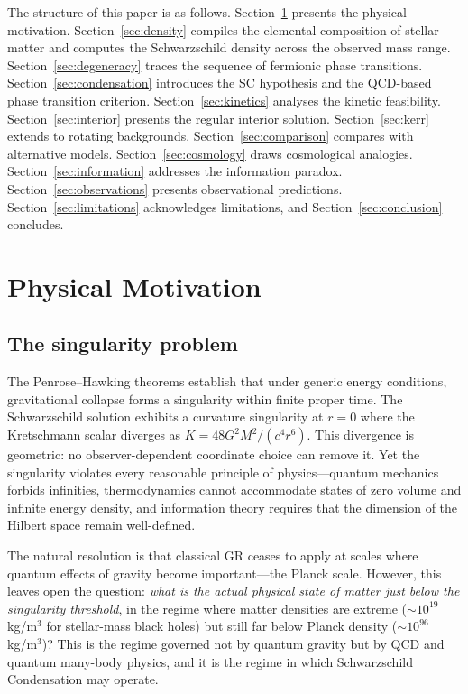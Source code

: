 \documentclass[epj]{svjour}
\begin{document}
The structure of this paper is as follows. Section~\ref{sec:motivation} presents the physical motivation. Section~\ref{sec:density} compiles the elemental composition of stellar matter and computes the Schwarzschild density across the observed mass range. Section~\ref{sec:degeneracy} traces the sequence of fermionic phase transitions. Section~\ref{sec:condensation} introduces the SC hypothesis and the QCD-based phase transition criterion. Section~\ref{sec:kinetics} analyses the kinetic feasibility. Section~\ref{sec:interior} presents the regular interior solution. Section~\ref{sec:kerr} extends to rotating backgrounds. Section~\ref{sec:comparison} compares with alternative models. Section~\ref{sec:cosmology} draws cosmological analogies. Section~\ref{sec:information} addresses the information paradox. Section~\ref{sec:observations} presents observational predictions. Section~\ref{sec:limitations} acknowledges limitations, and Section~\ref{sec:conclusion} concludes.

\section{Physical Motivation}
\label{sec:motivation}

\subsection{The singularity problem}
\label{sec:singularity}

The Penrose--Hawking theorems \cite{Penrose1965,HawkingEllis1973} establish that under generic energy conditions, gravitational collapse forms a singularity within finite proper time. The Schwarzschild solution exhibits a curvature singularity at $r=0$ where the Kretschmann scalar diverges as $K = 48 G^2 M^2 / (c^4 r^6)$. This divergence is geometric: no observer-dependent coordinate choice can remove it. Yet the singularity violates every reasonable principle of physics---quantum mechanics forbids infinities, thermodynamics cannot accommodate states of zero volume and infinite energy density, and information theory requires that the dimension of the Hilbert space remain well-defined.

The natural resolution is that classical GR ceases to apply at scales where quantum effects of gravity become important---the Planck scale. However, this leaves open the question: \emph{what is the actual physical state of matter just below the singularity threshold}, in the regime where matter densities are extreme ($\sim 10^{19}$ kg/m$^3$ for stellar-mass black holes) but still far below Planck density ($\sim 10^{96}$ kg/m$^3$)? This is the regime governed not by quantum gravity but by QCD and quantum many-body physics, and it is the regime in which Schwarzschild Condensation may operate.
\end{document}
